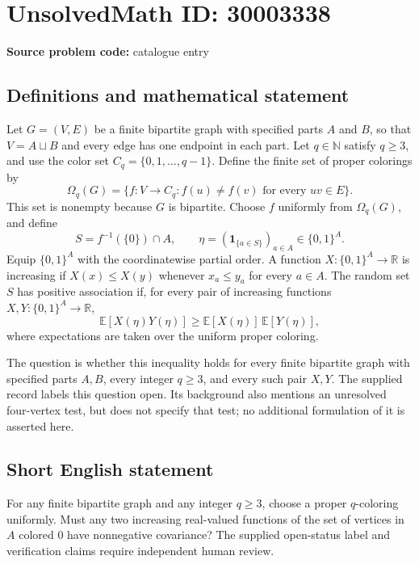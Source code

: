 \documentclass[11pt]{article}
\newcommand{\N}{\mathbb{N}}
\newcommand{\R}{\mathbb{R}}
\newcommand{\E}{\mathbb{E}}
\begin{document}
\section*{UnsolvedMath ID: 30003338}
\textbf{Source problem code:} catalogue entry
\subsection{Definitions and mathematical statement}
Let \(G=(V,E)\) be a finite bipartite graph with specified parts \(A\) and \(B\), so that \(V=A\sqcup B\) and every edge has one endpoint in each part. Let \(q\in\N\) satisfy \(q\geq3\), and use the color set \(C_q=\{0,1,\ldots,q-1\}\). Define the finite set of proper colorings by
\[
\Omega_q(G)=\{f:V\to C_q: f(u)\neq f(v)\text{ for every }uv\in E\}.
\]
This set is nonempty because \(G\) is bipartite. Choose \(f\) uniformly from \(\Omega_q(G)\), and define
\[
S=f^{-1}(\{0\})\cap A,\qquad \eta=(\mathbf{1}_{\{a\in S\}})_{a\in A}\in\{0,1\}^A.
\]
Equip \(\{0,1\}^A\) with the coordinatewise partial order. A function \(X:\{0,1\}^A\to\R\) is increasing if \(X(x)\leq X(y)\) whenever \(x_a\leq y_a\) for every \(a\in A\). The random set \(S\) has positive association if, for every pair of increasing functions \(X,Y:\{0,1\}^A\to\R\),
\[
\E[X(\eta)Y(\eta)]\geq\E[X(\eta)]\,\E[Y(\eta)],
\]
where expectations are taken over the uniform proper coloring.

The question is whether this inequality holds for every finite bipartite graph with specified parts \(A,B\), every integer \(q\geq3\), and every such pair \(X,Y\). The supplied record labels this question open. Its background also mentions an unresolved four-vertex test, but does not specify that test; no additional formulation of it is asserted here.
\subsection{Short English statement}
For any finite bipartite graph and any integer \(q\geq3\), choose a proper \(q\)-coloring uniformly. Must any two increasing real-valued functions of the set of vertices in \(A\) colored \(0\) have nonnegative covariance? The supplied open-status label and verification claims require independent human review.
\end{document}
